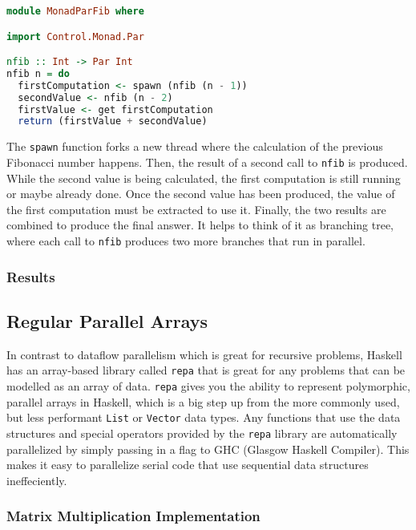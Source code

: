\documentclass[a4paper, 10pt]{article}
\begin{document}
\begin{lstlisting}[language=Haskell, caption=Fibonnaci using monad-par library]
module MonadParFib where

import Control.Monad.Par

nfib :: Int -> Par Int
nfib n = do
  firstComputation <- spawn (nfib (n - 1))
  secondValue <- nfib (n - 2)
  firstValue <- get firstComputation
  return (firstValue + secondValue)
\end{lstlisting}

The \lstinline{spawn} function forks a new thread where the calculation of the previous Fibonacci number happens. Then,  the result of a second call to \lstinline{nfib} is produced. While the second value is being calculated, the first computation is still running or maybe already done. Once the second value has been produced, the value of the first computation must be extracted to use it. Finally, the two results are combined to produce the final answer. It helps to think of it as branching tree, where each call to \lstinline{nfib} produces two more branches that run in parallel.

\subsubsection{Results}

\subsection{Regular Parallel Arrays}

In contrast to dataflow parallelism which is great for recursive problems, Haskell has an array-based library called \lstinline{repa} that is great for any problems that can be modelled as an array of data. \lstinline{repa} gives you the ability to represent polymorphic, parallel arrays in Haskell, which is a big step up from the more commonly used, but less performant \lstinline{List} or \lstinline{Vector} data types. Any functions that use the data structures and special operators provided by the  \lstinline{repa} library are automatically parallelized by simply passing in a flag to GHC (Glasgow Haskell Compiler). This makes it easy to parallelize serial code that use sequential data structures ineffeciently.

\subsubsection{Matrix Multiplication Implementation}
\end{document}
